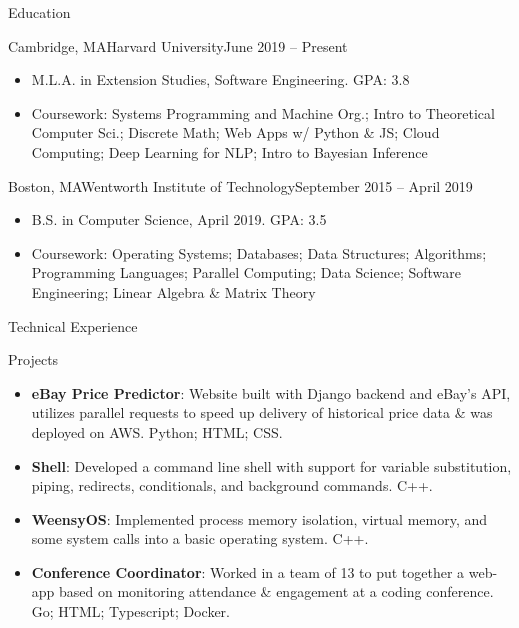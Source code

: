 \documentclass[]{mcdowellcv}
\begin{document}
	\begin{cvsection}{Education}
		\begin{cvsubsection}{Cambridge, MA}{Harvard University}{June 2019 -- Present}
		
			\begin{itemize}
				\item M.L.A. in Extension Studies, Software Engineering. GPA: 3.8
				\item Coursework: Systems Programming and Machine Org.; Intro to Theoretical Computer Sci.; Discrete Math; Web Apps w/ Python \& JS; Cloud Computing; Deep Learning for NLP; Intro to Bayesian Inference
				\end{itemize}
		\end{cvsubsection}
		\begin{cvsubsection}{Boston, MA}{Wentworth Institute of Technology}{September 2015 -- April 2019}
		\vspace{2mm}
			\begin{itemize}
				\item B.S. in Computer Science, April 2019. GPA: 3.5
				\item Coursework: Operating Systems; Databases; Data Structures; Algorithms; Programming Languages; Parallel Computing; Data Science; Software Engineering; Linear Algebra \& Matrix Theory
			\end{itemize}
		\end{cvsubsection}
	\end{cvsection}
	
	\begin{cvsection}{Technical Experience}
		\begin{cvsubsection}{Projects}{}{}
			\begin{itemize}
				\item \textbf{eBay Price Predictor}: Website built with Django backend and eBay's API, utilizes parallel requests to speed up delivery of historical price data \& was deployed on AWS. Python; HTML; CSS.
				\item \textbf{Shell}: Developed a command line shell with support for variable substitution, piping, redirects, conditionals, and background commands. C++.
				\item \textbf{WeensyOS}: Implemented process memory isolation, virtual memory, and some system calls into a basic operating system. C++.
				\item \textbf{Conference Coordinator}: Worked in a team of 13 to put together a web-app based on monitoring attendance \& engagement at a coding conference. Go; HTML; Typescript; Docker.
			\end{itemize}
		\end{cvsubsection}
	\end{cvsection}
	
\end{document}
